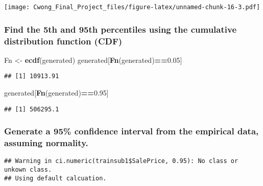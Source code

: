 \documentclass[]{article}
\newenvironment{Shaded}{\begin{snugshade}}{\end{snugshade}}
\newcommand{\KeywordTok}[1]{\textcolor[rgb]{0.13,0.29,0.53}{\textbf{#1}}}
\newcommand{\FloatTok}[1]{\textcolor[rgb]{0.00,0.00,0.81}{#1}}
\newcommand{\StringTok}[1]{\textcolor[rgb]{0.31,0.60,0.02}{#1}}
\newcommand{\OperatorTok}[1]{\textcolor[rgb]{0.81,0.36,0.00}{\textbf{#1}}}
\newcommand{\NormalTok}[1]{#1}
\begin{document}
\texttt{[image: Cwong\_Final\_Project\_files/figure-latex/unnamed-chunk-16-3.pdf]}

\subsubsection{Find the 5th and 95th percentiles using the cumulative
distribution function
(CDF)}\label{find-the-5th-and-95th-percentiles-using-the-cumulative-distribution-function-cdf}

\begin{Shaded}
\begin{Highlighting}[]
\NormalTok{Fn <-}\StringTok{ }\KeywordTok{ecdf}\NormalTok{(generated)}
\NormalTok{generated[}\KeywordTok{Fn}\NormalTok{(generated)}\OperatorTok{==}\FloatTok{0.05}\NormalTok{]}
\end{Highlighting}
\end{Shaded}

\begin{verbatim}
## [1] 10913.91
\end{verbatim}

\begin{Shaded}
\begin{Highlighting}[]
\NormalTok{generated[}\KeywordTok{Fn}\NormalTok{(generated)}\OperatorTok{==}\FloatTok{0.95}\NormalTok{]}
\end{Highlighting}
\end{Shaded}

\begin{verbatim}
## [1] 506295.1
\end{verbatim}

\subsubsection{Generate a 95\% confidence interval from the empirical
data, assuming
normality.}\label{generate-a-95-confidence-interval-from-the-empirical-data-assuming-normality.}

\begin{Shaded}
\end{Shaded}

\begin{verbatim}
## Warning in ci.numeric(trainsub1$SalePrice, 0.95): No class or unkown class.
## Using default calcuation.
\end{verbatim}
\end{document}
